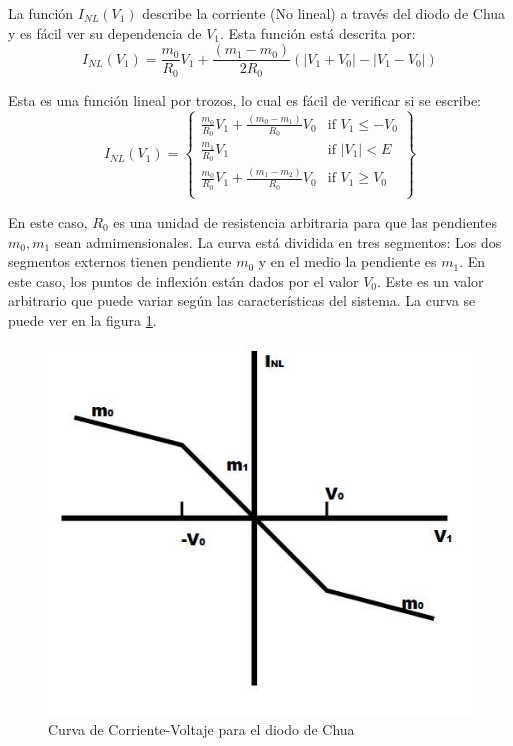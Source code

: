 \documentclass[%
 reprint,
 amsmath,amssymb,
 aps,
]{revtex4-1}
\begin{document}
La función $I_{NL} (V_1)$ describe la corriente (No lineal) a través del diodo de Chua y es fácil ver su dependencia de $V_1$. Esta función está descrita por:\\

\begin{equation}
	I_{NL}(V_1)=\frac{m_0}{R_0}V_1 + \frac{(m_1-m_0)}{2R_0}(|V_1+V_0|-|V_1-V_0|)
\end{equation}

Esta es una función lineal por trozos, lo cual es fácil de verificar si se escribe:\\
\begin{equation}
	I_{NL}(V_1) =
	\left\{
	\begin{array}{lll}
		\frac{m_0}{R_0} V_1 + \frac{(m_0 - m_1)}{R_0}V_0 & \mbox{if } V_1 \leq -V_0  \\
		\frac{m_1}{R_0} V_1	& \mbox{if } |V_1| < E \\
		\frac{m_0}{R_0} V_1 + \frac{(m_1 - m_2)}{R_0}V_0 & \mbox{if } V_1 \geq V_0 \\
	\end{array}
	\right\}
\label{eq:diodo}
\end{equation}

En este caso, $R_0$ es una unidad de resistencia arbitraria para que las pendientes $m_0, m_1$ sean admimensionales. La curva está dividida en tres segmentos: Los dos segmentos externos tienen pendiente $m_0$ y en el medio la pendiente es $m_1$. En este caso, los puntos de inflexión están dados por el valor $V_0$. Este es un valor arbitrario que puede variar según las características del sistema. La curva se puede ver en la figura \ref{fig:diodecharacteristic}\cite{sitio}.

\begin{figure}
\centering
\includegraphics[width=0.7\linewidth]{"characteristic"}
\caption{Curva de Corriente-Voltaje para el diodo de Chua}
\label{fig:diodecharacteristic}
\end{figure}
\end{document}
